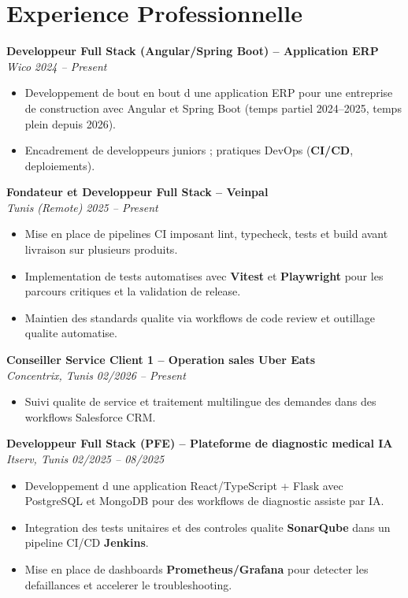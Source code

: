\documentclass[10pt,a4paper]{article}
\begin{document}
\vspace{2pt}

\section*{Experience Professionnelle}
{\small

\textbf{Developpeur Full Stack (Angular/Spring Boot) -- Application ERP}\\[1pt]
\textit{Wico} \hfill \textit{2024 -- Present}
\begin{itemize}
  \item Developpement de bout en bout d une application ERP pour une entreprise de construction avec Angular et Spring Boot (temps partiel 2024--2025, temps plein depuis 2026).
  \item Encadrement de developpeurs juniors ; pratiques DevOps (\textbf{CI/CD}, deploiements).
\end{itemize}

\vspace{2pt}
\textbf{Fondateur et Developpeur Full Stack -- Veinpal}\\[1pt]
\textit{Tunis (Remote)} \hfill \textit{2025 -- Present}
\begin{itemize}
  \item Mise en place de pipelines CI imposant lint, typecheck, tests et build avant livraison sur plusieurs produits.
  \item Implementation de tests automatises avec \textbf{Vitest} et \textbf{Playwright} pour les parcours critiques et la validation de release.
  \item Maintien des standards qualite via workflows de code review et outillage qualite automatise.
\end{itemize}

\vspace{2pt}
\textbf{Conseiller Service Client 1 -- Operation sales Uber Eats}\\[1pt]
\textit{Concentrix, Tunis} \hfill \textit{02/2026 -- Present}
\begin{itemize}
  \item Suivi qualite de service et traitement multilingue des demandes dans des workflows Salesforce CRM.
\end{itemize}

\vspace{2pt}
\textbf{Developpeur Full Stack (PFE) -- Plateforme de diagnostic medical IA}\\[1pt]
\textit{Itserv, Tunis} \hfill \textit{02/2025 -- 08/2025}
\begin{itemize}
  \item Developpement d une application React/TypeScript + Flask avec PostgreSQL et MongoDB pour des workflows de diagnostic assiste par IA.
  \item Integration des tests unitaires et des controles qualite \textbf{SonarQube} dans un pipeline CI/CD \textbf{Jenkins}.
  \item Mise en place de dashboards \textbf{Prometheus/Grafana} pour detecter les defaillances et accelerer le troubleshooting.
\end{itemize}

}
\end{document}
